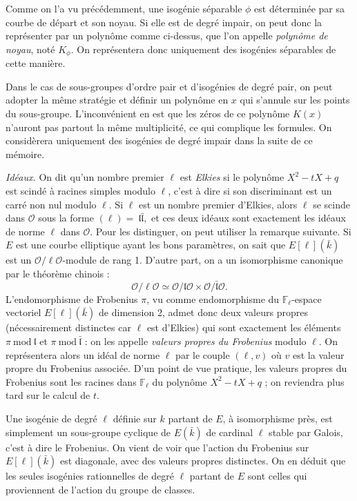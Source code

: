 \documentclass[11pt,a4paper]{article}
\newcommand{\F}{\mathbb{F}}
\renewcommand{\O}{\mathcal{O}}
\renewcommand{\frak}{\mathfrak}
\renewcommand{\mod}{\ \mathrm{mod}\ }
\renewcommand{\v}{\vspace{5mm}}
\theoremstyle{definition}
\begin{document}
Comme on l'a vu précédemment, une isogénie séparable $\phi$ est déterminée par sa courbe de départ et son noyau. Si elle est de degré impair, on peut donc la représenter par un polynôme comme ci-dessus, que l'on appelle \emph{polynôme de noyau}, noté $K_\phi$. On représentera donc uniquement des isogénies séparables de cette manière.

Dans le cas de sous-groupes d'ordre pair et d'isogénies de degré pair, on peut adopter la même stratégie et définir un polynôme en $x$ qui s'annule sur les points du sous-groupe. L'inconvénient en est que les zéros de ce polynôme $K(x)$ n'auront pas partout la même multiplicité, ce qui complique les formules. On considèrera uniquement des isogénies de degré impair dans la suite de ce mémoire. 
\v

\emph{Idéaux.} On dit qu'un nombre premier $\ell$ est \emph{Elkies} si le polynôme $X^2 - tX + q$ est scindé à racines simples modulo $\ell$, c'est à dire si son discriminant est un carré non nul modulo $\ell$. Si $\ell$ est un nombre premier d'Elkies, alors $\ell$ se scinde dans $\O$ sous la forme $(\ell) =~\frak l \bar{\frak l},$
et ces deux idéaux sont exactement les idéaux de norme $\ell$ dans $\O$. Pour les distinguer, on peut utiliser la remarque suivante. Si $E$ est une courbe elliptique ayant les bons paramètres, on sait que $E[\ell](\bar{k})$ est un $\O/\ell\O$-module de rang 1. D'autre part, on a un isomorphisme canonique par le théorème chinois :
$$\O/\ell\O \simeq \O/\frak l \O \times \O/\bar{\frak l} \O.$$
L'endomorphisme de Frobenius $\pi$, vu comme endomorphisme du $\F_\ell$-espace vectoriel $E[\ell](\bar{k})$ de dimension 2, admet donc deux valeurs propres (nécessairement distinctes car $\ell$ est d'Elkies) qui sont exactement les éléments $\pi\mod \frak l$ et $\pi\mod \bar{\frak l}$ : on les appelle \emph{valeurs propres du Frobenius} modulo $\ell$. On représentera alors un idéal de norme $\ell$ par le couple $(\ell, v)$ où $v$ est la valeur propre du Frobenius associée. D'un point de vue pratique, les valeurs propres du Frobenius sont les racines dans $\F_\ell$ du polynôme $X^2 - tX + q$ ; on reviendra plus tard sur le calcul de $t$.

Une isogénie de degré $\ell$ définie sur $k$ partant de $E$, à isomorphisme près, est simplement un sous-groupe cyclique de $E(\bar{k})$ de cardinal $\ell$ stable par Galois, c'est à dire le Frobenius.
On vient de voir que l'action du Frobenius sur $E[\ell](\bar{k})$ est diagonale, avec des valeurs propres distinctes. On en déduit que les seules isogénies rationnelles de degré $\ell$ partant de $E$ sont celles qui proviennent de l'action du groupe de classes.
\v
\end{document}
